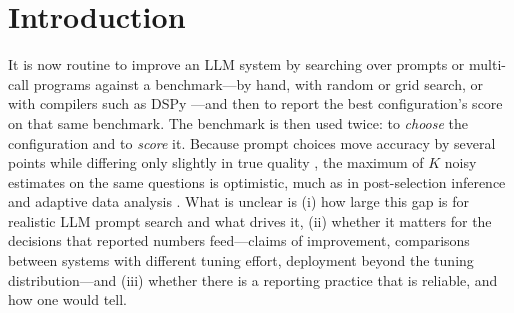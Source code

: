 \section{Introduction}\label{sec:intro}
It is now routine to improve an LLM system by searching over prompts or multi-call programs against a benchmark---by hand, with random or grid search, or with compilers such as DSPy \citep{khattab2023dspy,opsahl2024mipro}---and then to report the best configuration's score on that same benchmark.
The benchmark is then used twice: to \emph{choose} the configuration and to \emph{score} it.
Because prompt choices move accuracy by several points while differing only slightly in true quality \citep{sclar2024quantifying}, the maximum of $K$ noisy estimates on the same questions is optimistic, much as in post-selection inference \citep{berk2013valid,andrews2024inference} and adaptive data analysis \citep{dwork2015preserving,blum2015ladder}.
What is unclear is (i) how large this gap is for realistic LLM prompt search and what drives it, (ii) whether it matters for the decisions that reported numbers feed---claims of improvement, comparisons between systems with different tuning effort, deployment beyond the tuning distribution---and (iii) whether there is a reporting practice that is reliable, and how one would tell.

